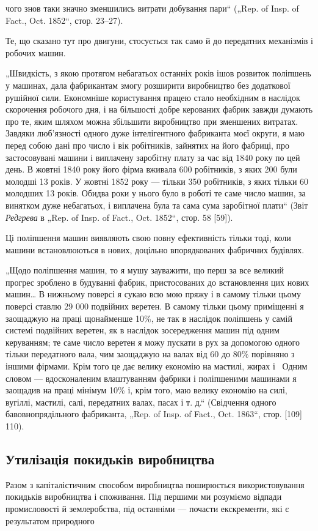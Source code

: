 \parcont{}  %
чого знов таки значно зменшились витрати добування пари“
(„Rep. of Insp. of Fact., Oct. 1852“, стор. 23--27).

Те, що сказано тут про двигуни, стосується так само й до
передатних механізмів і робочих машин.

„Швидкість, з якою протягом небагатьох останніх років
ішов розвиток поліпшень у машинах, дала фабрикантам змогу
розширити виробництво без додаткової рушійної сили. Економніше користування працею стало необхідним
в наслідок скорочення робочого дня, і на більшості добре керованих фабрик завжди думають про те,
яким шляхом можна збільшити
виробництво при зменшених витратах. Завдяки люб’язності одного
дуже інтелігентного фабриканта моєї округи, я маю перед собою дані про число і вік робітників,
зайнятих на його фабриці,
про застосовувані машини і виплачену заробітну плату за час
від 1840 року по цей день. В жовтні 1840 року його фірма
вживала 600 робітників, з яких 200 були молодші 13 років.
У жовтні 1852 року — тільки 350 робітників, з яких тільки 60
молодших 13 років. Обидва роки у нього було в роботі те саме
число машин, за винятком дуже небагатьох, і виплачена була та
сама сума заробітної плати“ (Звіт \emph{Редгрева} в „Rep. of Insp. of
Fact., Oct. 1852“, стор. 58 [59]).

Ці поліпшення машин виявляють свою повну ефективність
тільки тоді, коли машини встановлюються в нових, доцільно
впорядкованих фабричних будівлях.

„Щодо поліпшення машин, то я мушу зауважити, що перш
за все великий прогрес зроблено в будуванні фабрик, пристосованих до встановлення цих нових машин\dots{}
В нижньому поверсі
я сукаю всю мою пряжу і в самому тільки цьому поверсі
ставлю 29 000 подвійних веретен. В самому тільки цьому приміщенні я заощаджую на праці щонайменше
10\%, не так в наслідок поліпшень у самій системі подвійних веретен, як в наслідок зосередження машин
під одним керуванням; те саме число
веретен я можу пускати в рух за допомогою одного тільки
передатного вала, чим заощаджую на валах від 60 до 80\% порівняно з іншими фірмами. Крім того це дає
велику економію
на мастилі, жирах і~ Одним словом — вдосконаленим
влаштуванням фабрики і поліпшеними машинами я заощадив на
праці мінімум 10\% і, крім того, маю велику економію на силі,
вугіллі, мастилі, салі, передатних валах, пасах і т. д.“ (Свідчення
одного бавовнопрядільного фабриканта, „Rep. of Insp. of Fact.,
Oct. 1863“, стор. [109] 110).

\subsection{Утилізація покидьків виробництва}

Разом з капіталістичним способом виробництва поширюється
використовування покидьків виробництва і споживання. Під першими ми розуміємо відпади промисловості
й землеробства, під
останніми — почасти екскременти, які є результатом природного
\parbreak{}  %
